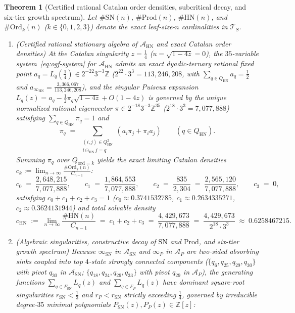 \documentclass[11pt,reqno]{amsart}
\numberwithin{equation}{section}
\theoremstyle{plain}
\newtheorem{theorem}{Theorem}[section]
\theoremstyle{definition}
\theoremstyle{remark}
\newcommand{\TS}{\mathcal{T}_S}
\newcommand{\SN}{\mathrm{SN}}
\newcommand{\HN}{\mathrm{HN}}
\newcommand{\Prod}{\mathrm{Prod}}
\begin{document}
\begin{theorem}[Certified rational Catalan order densities, subcritical decay, and six-tier growth spectrum]
\label{thm:asymptotics}
Let $\#\SN(n)$, $\#\Prod(n)$, $\#\HN(n)$, and $\#\mathrm{Ord}_k(n)$ ($k \in \{0, 1, 2, 3\}$) denote the exact leaf-size-$n$ cardinalities in $\TS$.
\begin{enumerate}[label=(\roman*),leftmargin=2.2em]
\item \emph{(Certified rational stationary algebra of $\mathcal{A}_{\HN}$ and exact Catalan order densities)} At the Catalan singularity $z = \frac{1}{4}$ ($u = \sqrt{1 - 4z} = 0$), the $35$-variable system~\eqref{eq:ogf-system} for $\mathcal{A}_{\HN}$ admits an exact dyadic-ternary rational fixed point $a_q = L_q(\frac{1}{4}) \in 2^{-22} 3^{-3}\mathbb{Z}$ ($2^{22}\cdot 3^3 = 113{,}246{,}208$, with $\sum_{q \in Q_{\HN}} a_q = \frac{1}{2}$ and $a_{\infty_{\HN}} = \frac{3{,}366{,}067}{113{,}246{,}208}$), and the singular Puiseux expansion $L_q(z) = a_q - \frac{1}{2}\pi_q \sqrt{1 - 4z} + O(1 - 4z)$ is governed by the unique normalized rational eigenvector $\pi \in 2^{-18} 3^{-3}\mathbb{Z}^{35}$ ($2^{18}\cdot 3^3 = 7{,}077{,}888$) satisfying $\sum_{q \in Q_{\HN}} \pi_q = 1$ and
\[
\pi_q \;=\; \sum_{\substack{(i, j) \in Q_{\HN}^2 \\ i \odot_{\HN} j = q}} (a_i \pi_j + \pi_i a_j)
\qquad (q \in Q_{\HN}).
\]
Summing $\pi_q$ over $Q_{\mathrm{ord}=k}$ yields the exact limiting Catalan densities $c_k := \lim_{n \to \infty} \frac{\#\mathrm{Ord}_k(n)}{C_{n-1}}$:
\begin{equation}
\label{eq:exact-order-densities}
c_0 \;=\; \frac{2{,}648{,}215}{7{,}077{,}888}, \qquad
c_1 \;=\; \frac{1{,}864{,}553}{7{,}077{,}888}, \qquad
c_2 \;=\; \frac{835}{2{,}304} \;=\; \frac{2{,}565{,}120}{7{,}077{,}888}, \qquad
c_3 \;=\; 0,
\end{equation}
satisfying $c_0 + c_1 + c_2 + c_3 = 1$ ($c_0 \approx 0.3741532785$, $c_1 \approx 0.2634335271$, $c_2 \approx 0.3624131944$) and total solvable density
\begin{equation}
\label{eq:chn-exact}
c_{\HN} \;:=\; \lim_{n \to \infty} \frac{\#\HN(n)}{C_{n-1}}
\;=\; c_1 + c_2 + c_3
\;=\; \frac{4{,}429{,}673}{7{,}077{,}888}
\;=\; \frac{4{,}429{,}673}{2^{18} \cdot 3^3}
\;\approx\; 0.6258467215.
\end{equation}
\item \emph{(Algebraic singularities, constructive decay of $\SN$ and $\Prod$, and six-tier growth spectrum)} Because $\infty_{\SN}$ in $\mathcal{A}_{\SN}$ and $\infty_P$ in $\mathcal{A}_P$ are two-sided absorbing sinks coupled into top $4$-state strongly connected components ($\{q_6, q_{25}, q_{29}, q_{30}\}$ with pivot $q_{30}$ in $\mathcal{A}_{\SN}$; $\{q_{18}, q_{24}, q_{29}, q_{33}\}$ with pivot $q_{29}$ in $\mathcal{A}_P$), the generating functions $\sum_{q \in F_{\SN}} L_q(z)$ and $\sum_{q \in F_P} L_q(z)$ have dominant square-root singularities $r_{\SN} < \frac{1}{3}$ and $r_P < r_{\SN}$ strictly exceeding $\frac{1}{4}$, governed by irreducible degree-$35$ minimal polynomials $P_{\SN}(z), P_P(z) \in \mathbb{Z}[z]$:

\end{enumerate}
\end{theorem}
\end{document}
